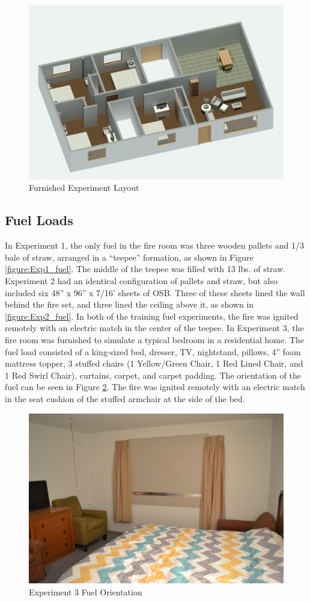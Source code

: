 \documentclass{article}
\begin{document}
\begin{figure}[H]
\centering
\includegraphics[width=.75\textwidth]{0_Images/Ranch_Pictures/Report_ISO_Furniture.jpg}
\caption{Furnished Experiment Layout}
\label{figure:ranchexp3_floorplan}
\end{figure}

\subsection{Fuel Loads}
 In Experiment 1, the only fuel in the fire room was three wooden pallets and 1/3 bale of straw,  arranged in a ``teepee'' formation, as shown in Figure \ref{figure:Exp1_fuel}. The middle of the teepee was filled with 13 lbs. of straw.  Experiment 2 had an identical configuration of pallets and straw, but also included six  48'' x 96'' x 7/16'  sheets of OSB. Three of these sheets lined the wall behind the fire set, and three lined the ceiling above it, as shown in \ref{figure:Exp2_fuel}. In both of the training fuel experiments, the fire was ignited remotely with an electric match in the center of the teepee. In Experiment 3, the fire room was furnished to simulate a typical bedroom in a residential home. The fuel load consisted of a king-sized bed, dresser, TV, nightstand, pillows, 4'' foam mattress topper, 3 stuffed chairs (1 Yellow/Green Chair, 1 Red Lined Chair, and 1 Red Swirl Chair), curtains, carpet, and carpet padding.  The orientation of the fuel can be seen in Figure \ref{figure:Exp3_fuel}. The fire was ignited remotely  with an electric match in the seat cushion of the stuffed armchair at the side of the bed.

\begin{figure}[H]
\centering
\includegraphics[width=.75\textwidth]{0_Images/Ranch_Pictures/Exp_3_Fuel.jpg}
\caption{Experiment 3 Fuel Orientation}
\label{figure:Exp3_fuel}
\end{figure}
\end{document}
